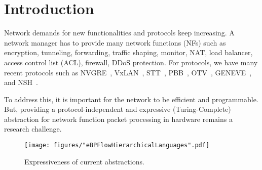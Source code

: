 \section{Introduction}
\label{sec:intro}

Network demands for new functionalities and protocols keep increasing. A network manager has to provide many network functions (NFs) such as encryption, tunneling, forwarding, traffic shaping, monitor, NAT, load balancer, access control list (ACL), firewall, DDoS protection. For protocols, we have many recent protocols such as NVGRE~\cite{rfc7637}, VxLAN~\cite{mahalingam2013}, STT~\cite{davie2014stt}, PBB~\cite{kishjac-bmwg-evpntest-08}, OTV~\cite{hasmit-otv-04}, GENEVE~\cite{ietf-nvo3-geneve-05}, and NSH~\cite{rfc8300}.

To address this, it is important for the network to be efficient and programmable. But, providing a protocol-independent and expressive (Turing-Complete) abstraction for network function packet processing in hardware remains a research challenge.


\begin{figure}[th]
\centering
\texttt{[image: figures/"eBPFlowHierarchicalLanguages".pdf]}
\caption{Expressiveness of current abstractions.}
\label{fig:Language}
\end{figure}

 

